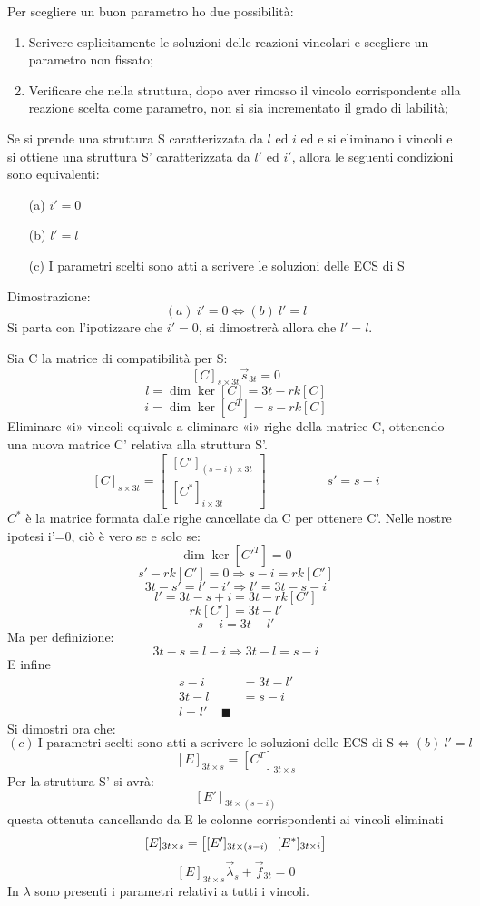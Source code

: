 \documentclass{article}
\begin{document}
\begin{adjustwidth}{2in}{}
		Per scegliere un buon parametro ho due possibilità:
		\begin{enumerate}
			\item Scrivere esplicitamente le soluzioni delle reazioni vincolari e scegliere un parametro non fissato;
			\item Verificare che nella struttura, dopo aver rimosso il vincolo corrispondente alla reazione scelta
			come parametro, non si sia incrementato il grado di labilità;
		\end{enumerate}
	
		Se si prende una struttura S caratterizzata da $l$ ed $i$ ed e si eliminano i vincoli e si ottiene una struttura S' caratterizzata da $l'$ ed $i'$, allora le seguenti condizioni sono equivalenti:
	
		\begin{itemize}
			\item[(a)] $i'=0$
			\item[(b)] $ l'= l $
			\item[(c)] I parametri scelti sono atti a scrivere le soluzioni delle ECS di S
		\end{itemize}
Dimostrazione:
		\[ (a) ~ i'= 0 \Leftrightarrow (b) ~ l'= l \]
		Si parta con l'ipotizzare che $i'= 0$, si dimostrerà allora che $l'= l$. \newline
		
		Sia C la matrice di compatibilità per S:
		\[ [C]_{s\times 3t} \vec{s}_{3t} = 0\]
		\[ l = \dim \ker[C] = 3t - rk[C]\]
		\[ i = \dim \ker[C^T] = s - rk[C]\]
		Eliminare «i» vincoli equivale a eliminare «i» righe della matrice C, ottenendo una nuova matrice C'
		relativa alla struttura S'.
		\[
		[C]_{s\times 3t} = \left[ \begin{array}{c}
			[C']_{(s-i)\times 3t} \\
			\left[ C^*\right]_{i\times 3t}
		\end{array}\right] \hspace{2cm} s'= s -i
		\]
		$C^*$ è la matrice formata dalle righe cancellate da C per ottenere C'.
		Nelle nostre ipotesi i'=0, ciò è vero se e solo se:
		\[\dim\ker[C'^T] = 0\]
		\[s' - rk[C'] = 0 \Rightarrow s - i = rk[C']\]
		\[ 3t - s'= l'- i'\Rightarrow l'= 3t - s - i\]
		\[l'= 3t - s + i = 3t - rk[C']\]
		\[rk[C'] = 3t - l'\]
		\[ s - i = 3t - l'\]
		Ma per definizione:
		\[ 3t - s = l - i \Rightarrow 3t - l = s - i\]
		E infine
		\[ \begin{split} s - i & = 3t - l' \\ 3t - l & = s - i \\ l = l' ~~~~~ \blacksquare \end{split} \]		
Si dimostri ora che:
		\[ (c) ~ \text{I parametri scelti sono atti a scrivere le soluzioni delle ECS di S} \Leftrightarrow (b) ~ l'= l\]
		\[[E]_{3t \times s} = [C^T]_{3t \times s}\]
		Per la struttura S' si avrà:
		\[[E']_{3t \times (s-i)}\]
		questa ottenuta cancellando da E le colonne corrispondenti ai vincoli eliminati
		\[ [E]_{3t \times s} = \left[ [E']_{3t \times (s-i)} \hspace{0.25cm} [E^*]_{3t \times i} \right] \]
		\[ [E]_{3t \times s} \vec{\lambda}_s + \vec{f}_{3t} = 0\]
		In $ \lambda $ sono presenti i parametri relativi a tutti i vincoli.
		

\end{adjustwidth}
\end{document}
